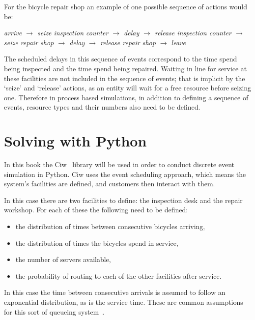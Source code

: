For the bicycle repair shop an example of one possible sequence of actions would
be:

\textit{arrive
        \(\rightarrow\)
        seize inspection counter
        \(\rightarrow\)
        delay
        \(\rightarrow\)
        release inspection counter
        \(\rightarrow\)
        seize repair shop
        \(\rightarrow\)
        delay
        \(\rightarrow\)
        release repair shop
        \(\rightarrow\)
        leave
        }

The scheduled delays in this sequence of events correspond to the time spend
being inspected and the time spend being repaired. Waiting in line for service
at these facilities are not included in the sequence of events; that is implicit
by the `seize' and `release' actions, as an entity will wait for a free resource
before seizing one.
Therefore in process based simulations, in addition to defining a sequence of
events, resource types and their numbers also need to be defined.


\section{Solving with Python}\label{sec:discrete_event_simulation_solving-with-python}

In this book the Ciw~\cite{ciwpython, palmer2019ciw}
library will be used in order to conduct discrete event
simulation in Python.
Ciw uses the event scheduling approach, which means the
system's facilities are defined, and customers then interact with them.

In this case there are two facilities to define: the inspection desk and the
repair workshop. For each of these the following need to be defined:

\begin{itemize}
  \item the distribution of times between consecutive bicycles arriving,
  \item the distribution of times the bicycles spend in service,
  \item the number of servers available,
  \item the probability of routing to each of the other facilities after
  service.
\end{itemize}

In this case the time between consecutive arrivals is assumed to follow an
exponential distribution, as is the service time.
These are common assumptions for this sort of queueing system~\cite{stewart2009probability}.

